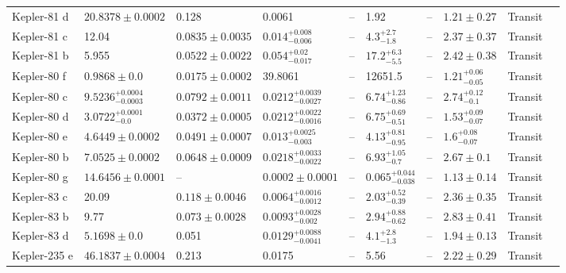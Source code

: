 \begin{tabular}{llllllllll}
Kepler-81 d & $20.8378 \pm 0.0002$ & 0.128 & 0.0061 & -- & 1.92 & -- & $1.21 \pm 0.27$ & Transit & \cite{ROWE_ET_AL__2014} \\
Kepler-81 c & 12.04 & $0.0835 \pm 0.0035$ & $0.014^{+0.008}_{-0.006}$ & -- & $4.3^{+2.7}_{-1.8}$ & -- & $2.37 \pm 0.37$ & Transit & \cite{XIE_2013} \\
Kepler-81 b & 5.955 & $0.0522 \pm 0.0022$ & $0.054^{+0.02}_{-0.017}$ & -- & $17.2^{+6.3}_{-5.5}$ & -- & $2.42 \pm 0.38$ & Transit & \cite{XIE_2013} \\
Kepler-80 f & $0.9868 \pm 0.0$ & $0.0175 \pm 0.0002$ & 39.8061 & -- & 12651.5 & -- & $1.21^{+0.06}_{-0.05}$ & Transit & \cite{MACDONALD_ET_AL__2016} \\
Kepler-80 c & $9.5236^{+0.0004}_{-0.0003}$ & $0.0792 \pm 0.0011$ & $0.0212^{+0.0039}_{-0.0027}$ & -- & $6.74^{+1.23}_{-0.86}$ & -- & $2.74^{+0.12}_{-0.1}$ & Transit & \cite{MACDONALD_ET_AL__2016} \\
Kepler-80 d & $3.0722^{+0.0001}_{-0.0}$ & $0.0372 \pm 0.0005$ & $0.0212^{+0.0022}_{-0.0016}$ & -- & $6.75^{+0.69}_{-0.51}$ & -- & $1.53^{+0.09}_{-0.07}$ & Transit & \cite{MACDONALD_ET_AL__2016} \\
Kepler-80 e & $4.6449 \pm 0.0002$ & $0.0491 \pm 0.0007$ & $0.013^{+0.0025}_{-0.003}$ & -- & $4.13^{+0.81}_{-0.95}$ & -- & $1.6^{+0.08}_{-0.07}$ & Transit & \cite{MACDONALD_ET_AL__2016} \\
Kepler-80 b & $7.0525 \pm 0.0002$ & $0.0648 \pm 0.0009$ & $0.0218^{+0.0033}_{-0.0022}$ & -- & $6.93^{+1.05}_{-0.7}$ & -- & $2.67 \pm 0.1$ & Transit & \cite{MACDONALD_ET_AL__2016} \\
Kepler-80 g & $14.6456 \pm 0.0001$ & -- & $0.0002 \pm 0.0001$ & -- & $0.065^{+0.044}_{-0.038}$ & -- & $1.13 \pm 0.14$ & Transit & \cite{SHALLUE__AMP__VANDERBURG_2018} \\
Kepler-83 c & 20.09 & $0.118 \pm 0.0046$ & $0.0064^{+0.0016}_{-0.0012}$ & -- & $2.03^{+0.52}_{-0.39}$ & -- & $2.36 \pm 0.35$ & Transit & \cite{XIE_2013} \\
Kepler-83 b & 9.77 & $0.073 \pm 0.0028$ & $0.0093^{+0.0028}_{-0.002}$ & -- & $2.94^{+0.88}_{-0.62}$ & -- & $2.83 \pm 0.41$ & Transit & \cite{XIE_2013} \\
Kepler-83 d & $5.1698 \pm 0.0$ & 0.051 & $0.0129^{+0.0088}_{-0.0041}$ & -- & $4.1^{+2.8}_{-1.3}$ & -- & $1.94 \pm 0.13$ & Transit & \cite{ROWE_ET_AL__2014} \\
Kepler-235 e & $46.1837 \pm 0.0004$ & 0.213 & 0.0175 & -- & 5.56 & -- & $2.22 \pm 0.29$ & Transit & \cite{ROWE_ET_AL__2014} \\

\end{tabular}
